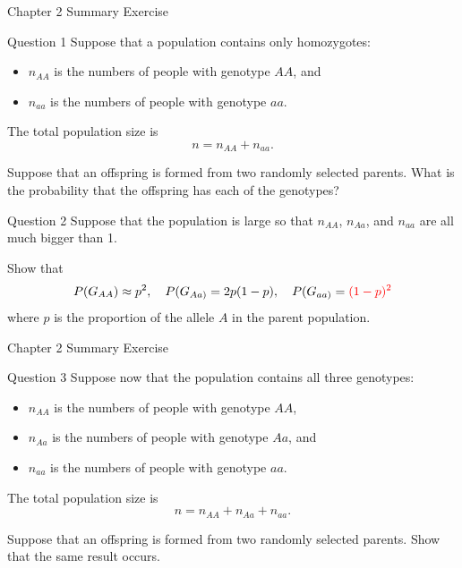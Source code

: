 \documentclass[aspectratio=169,xcolor=pdftex,dvipsnames,table]{beamer}\usepackage[]{graphicx}\usepackage[]{xcolor}
\begin{document}

\begin{frame}{Chapter 2 Summary Exercise}
  \begin{block}{Question 1}
   Suppose that a population contains only homozygotes: 
   \begin{itemize}
   \item $n_{AA}$ is the numbers of people with genotype $AA$, and 
   \item $n_{aa}$ is the numbers of people with genotype $aa$. 
   \end{itemize}
   
   The total population size is
   $$
   n=n_{AA}+n_{aa}.
   $$
   
  \medskip
  
  Suppose that an offspring is formed from two randomly selected parents. What is the probability that the offspring has each of the genotypes?
  \end{block}

\end{frame}

\begin{frame}
  \begin{block}{Question 2}
  Suppose that the population is large so that $n_{AA}$, $n_{Aa}$, and $n_{aa}$ are all much bigger than 1. 
  
  \medskip
  Show that
  $$
  P(G_{AA}) \approx p^2, \quad P(G_{Aa)}=2p(1-p), \quad P(G_{aa)}=\textcolor{red}{(1-p)^2}
  $$
  where $p$ is the proportion of the allele $A$ in the parent population.
  \end{block}
\end{frame}

\begin{frame}{Chapter 2 Summary Exercise}
  \begin{block}{Question 3}
     Suppose now that the population contains all three genotypes:
     \begin{itemize}
    \item $n_{AA}$ is the numbers of people with genotype $AA$,
    \item $n_{Aa}$ is the numbers of people with genotype $Aa$, and
    \item $n_{aa}$ is the numbers of people with genotype $aa$. 
     \end{itemize}
   
   The total population size is
   $$
   n=n_{AA}+n_{Aa}+n_{aa}.
   $$
   
   \medskip
   
    Suppose that an offspring is formed from two randomly selected parents. Show that the same result occurs.
  \end{block}
\end{frame}
\end{document}
